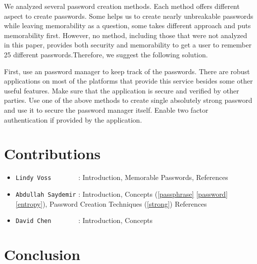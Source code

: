 \documentclass[acmsmall,nonacm]{acmart}
\begin{document}
We analyzed several password creation methods. Each method offers different aspect to create passwords. Some helps us to create nearly unbreakable passwords while leaving memorability as a question, some takes different approach and puts memorability first. However, no method, including those that were not analyzed in this paper, provides both security and memorability  to get a user to remember 25 different passwords.Therefore, we suggest the following solution.

First, use an password manager to keep track of the passwords. There are robust applications on most of the platforms that provide this service besides some other useful features. Make sure that the application is secure and verified by other parties. Use one of the above methods to create single absolutely strong password and use it to secure the password manager itself. Enable two factor authentication if provided by the application.


\section{Contributions}
\begin{itemize}
\item{\verb|Lindy Voss       |} : Introduction, Memorable Passwords, References
\item{\verb|Abdullah Saydemir|} : Introduction, Concepts (\ref{passphrase} \ref{password} \ref{entropy}), Password Creation Techniques (\ref{strong}) References
\item{\verb|David Chen       |} : Introduction, Concepts
\end{itemize}


\section{Conclusion}






\appendix
\end{document}
